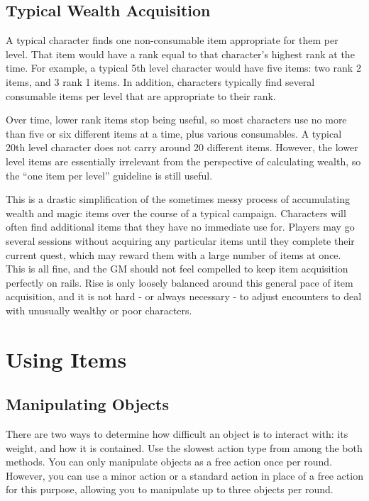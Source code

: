   \subsection{Typical Wealth Acquisition}
    A typical character finds one non-consumable item appropriate for them per level.
    That item would have a rank equal to that character's highest rank at the time.
    For example, a typical 5th level character would have five items: two rank 2 items, and 3 rank 1 items.
    In addition, characters typically find several consumable items per level that are appropriate to their rank.

    Over time, lower rank items stop being useful, so most characters use no more than five or six different items at a time, plus various consumables.
    A typical 20th level character does not carry around 20 different items.
    However, the lower level items are essentially irrelevant from the perspective of calculating wealth, so the ``one item per level'' guideline is still useful.

    This is a drastic simplification of the sometimes messy process of accumulating wealth and magic items over the course of a typical campaign.
    Characters will often find additional items that they have no immediate use for.
    Players may go several sessions without acquiring any particular items until they complete their current quest, which may reward them with a large number of items at once.
    This is all fine, and the GM should not feel compelled to keep item acquisition perfectly on rails.
    Rise is only loosely balanced around this general pace of item acquisition, and it is not hard - or always necessary - to adjust encounters to deal with unusually wealthy or poor characters.

\section{Using Items}

  \subsection{Manipulating Objects}\label{Manipulating Objects}
    There are two ways to determine how difficult an object is to interact with: its weight, and how it is contained.
    Use the slowest action type from among the both methods.
    You can only manipulate objects as a free action once per round.
    However, you can use a minor action or a standard action in place of a free action for this purpose, allowing you to manipulate up to three objects per round.

